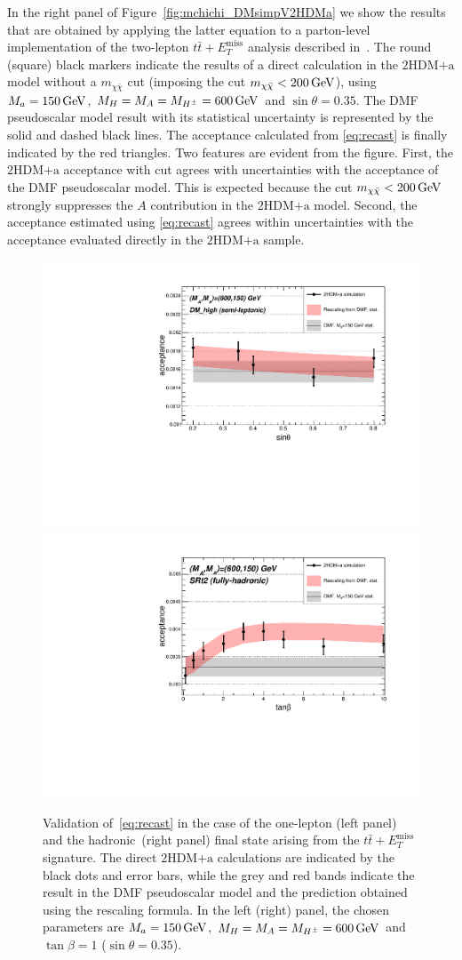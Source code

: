 \documentclass[a4paper, 11pt,notoc]{article}
\newcommand{\MET}{\ensuremath{E_T^\mathrm{miss}}\xspace}
\newcommand{\mA}{\ensuremath{M_{A}}\xspace}
\newcommand{\ma}{\ensuremath{M_{a}}\xspace}
\newcommand{\mH}{\ensuremath{M_{H}}\xspace}
\newcommand{\mHc}{\ensuremath{M_{H^{\pm}}}\xspace}
\newcommand{\hdma}{\ensuremath{\textrm{2HDM+a}}\xspace}
\begin{document}
In the right panel of Figure~\ref{fig:mchichi_DMsimpV2HDMa} we show the results that are obtained by applying the latter equation to a parton-level implementation of the two-lepton $t \bar t + \MET$ analysis described in~\cite{Aaboud:2017rzf}. The round (square) black markers indicate the results of a direct calculation in the \hdma model without a $m_{\chi \bar \chi}$ cut (imposing the cut $m_{\chi \bar \chi} < 200 \, {\rm GeV}$), using $\ma = 150 \, {\rm GeV}$, $\mH= \mA = \mHc =600 \, {\rm GeV}$ and $\sin\theta=0.35$. The DMF pseudoscalar model result with its statistical uncertainty is represented by the solid and dashed black lines. The acceptance calculated from \eqref{eq:recast} is finally indicated by the red triangles. Two features are evident from the figure. First, the \hdma acceptance with cut agrees with uncertainties with the acceptance of the DMF pseudoscalar model. This is expected because the cut $m_{\chi \bar \chi} < 200 \, {\rm GeV}$ strongly suppresses the $A$ contribution in the \hdma model. Second, the acceptance estimated using  \eqref{eq:recast} agrees within uncertainties with the acceptance evaluated directly in the \hdma sample. 

\begin{figure}[t!]
\includegraphics[width=.5\textwidth]{DM_high_600_150_sin.pdf}
\includegraphics[width=.5\textwidth]{SRt2_600_150_tan.pdf}
\vspace{2mm}
\caption{Validation of~\eqref{eq:recast} in the case of the one-lepton (left panel) and the hadronic~(right panel)  final state arising from the $t \bar t+\MET$ signature. The direct \hdma calculations are indicated by the black dots and error bars, while the grey and red bands indicate the result in the DMF pseudoscalar model and the prediction obtained using the rescaling formula.  In the left (right) panel, the  chosen parameters are $\ma = 150 \, {\rm GeV}$, $\mH= \mA = \mHc = 600 \, {\rm GeV}$ and $\tan \beta = 1$ ($\sin\theta=0.35$).}
\label{DMHF:pof}
\end{figure}
\end{document}
